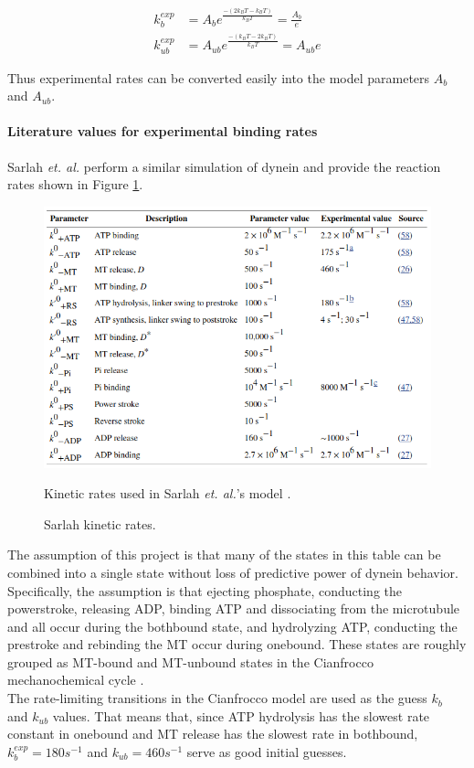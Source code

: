 \documentclass[10pt]{article} %
\begin{document}
\begin{align*}
  k_b^{exp} &= A_be^{\frac{-\left(2k_BT - k_BT\right)}{k_BT}} = \frac{A_b}{e}\\
  k_{ub}^{exp} &= A_{ub}e^{\frac{-\left(k_BT-2k_BT\right)}{k_BT}} = A_{ub}e
\end{align*}

Thus experimental rates can be converted easily into the model parameters $A_b$ and $A_{ub}$.

\paragraph{Literature values for experimental binding rates}
Sarlah \textit{et. al.} \cite{sarlahmodel} perform a similar simulation of dynein and provide the reaction rates shown in Figure \ref{fig:sarlah-rate-table}.

\begin{figure}[h]
  \centering
  \includegraphics[width=.45\textwidth]{../../figures/SarlahParameterTable.png}
  \caption{Sarlah kinetic rates.}{Kinetic rates used in Sarlah \textit{et. al.}'s model \cite{sarlahmodel}.}
  \label{fig:sarlah-rate-table}
\end{figure}

The assumption of this project is that many of the states in this table can be combined into a single state without loss of predictive power of dynein behavior. Specifically, the assumption is that ejecting phosphate, conducting the powerstroke, releasing ADP, binding ATP and dissociating from the microtubule and all occur during the bothbound state, and hydrolyzing ATP, conducting the prestroke and rebinding the MT occur during onebound. These states are roughly grouped as MT-bound and MT-unbound states in the Cianfrocco mechanochemical cycle \cite{cianfroccoreview}.\\

The rate-limiting transitions in the Cianfrocco model are used as the guess $k_b$ and $k_{ub}$ values. That means that, since ATP hydrolysis has the slowest rate constant in onebound and MT release has the slowest rate in bothbound, $k_b^{exp} = 180 s^{-1}$ and $k_{ub} = 460 s^{-1}$ serve as good initial guesses.\\
\end{document}
